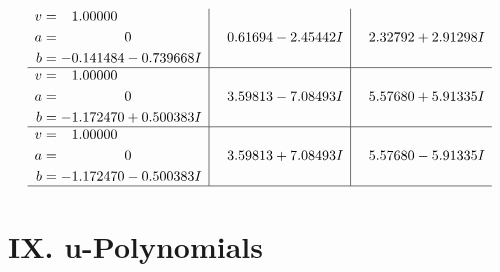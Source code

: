 \documentclass[1p]{elsarticle_modified}
\theoremstyle{definition}
\begin{document}
$$\begin{array}{c|c|c}
\begin{aligned}
v &= \phantom{-}1.00000\phantom{ +0.000000I} \\
a &= \phantom{-0.000000 } 0 \\
b &= -0.141484 - 0.739668 I\end{aligned}
 & \phantom{-}0.61694 - 2.45442 I & \phantom{-}2.32792 + 2.91298 I \\ \hline\begin{aligned}
v &= \phantom{-}1.00000\phantom{ +0.000000I} \\
a &= \phantom{-0.000000 } 0 \\
b &= -1.172470 + 0.500383 I\end{aligned}
 & \phantom{-}3.59813 - 7.08493 I & \phantom{-}5.57680 + 5.91335 I \\ \hline\begin{aligned}
v &= \phantom{-}1.00000\phantom{ +0.000000I} \\
a &= \phantom{-0.000000 } 0 \\
b &= -1.172470 - 0.500383 I\end{aligned}
 & \phantom{-}3.59813 + 7.08493 I & \phantom{-}5.57680 - 5.91335 I\\
 \hline 
 \end{array}$$\newpage
\newpage\renewcommand{\arraystretch}{1}
\centering \section*{ IX. u-Polynomials}
\end{document}
